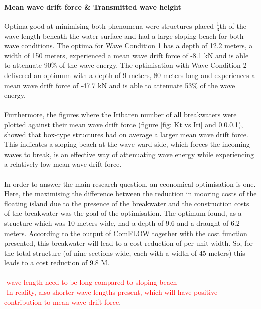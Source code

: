 \paragraph{Mean wave drift force \& Transmitted wave height} Optima good at minimising both phenomena were structures placed $\frac{1}{3}$th of the wave length beneath the water surface and had a large sloping beach for both wave conditions. The optima for Wave Condition 1 has a depth of 12.2 meters, a width of 150 meters, experienced a mean wave drift force of -8.1 kN and is able to attenuate 90\% of the wave energy. The optimisation with Wave Condition 2 delivered an optimum with a depth of 9 meters, 80 meters long and experiences a mean wave drift force of -47.7 kN and is able to attenuate 53\% of the wave energy. \\
\\
Furthermore, the figures where the Iribaren number of all breakwaters were plotted against their mean wave drift force (figure \ref{fig: Kt vs Iri} and \ref{}), showed that box-type structures had on average a larger mean wave drift force. This indicates a sloping beach at the wave-ward side, which forces the incoming waves to break, is an effective way of attenuating wave energy while experiencing a relatively low mean wave drift force. \\
\\
In order to answer the main research question, an economical optimisation is one. Here, the maximising the difference between the reduction in mooring costs of the floating island due to the presence of the breakwater and the construction costs of the breakwater was the goal of the optimisation. The optimum found, as a structure which was 10 meters wide, had a depth of 9.6 and a draught of 6.2 meters. According to the output of ComFLOW together with the cost function presented, this breakwater will lead to a cost reduction of  per unit width. So, for the total structure (of nine sections wide, each with a width of 45 meters) this leads to a cost reduction of 9.8 M\texteuro.\\
\\
-\textcolor{red}{wave length need to be long compared to sloping beach}\\
-\textcolor{red}{In reality, also shorter wave lengths present, which will have positive contribution to mean wave drift force}.








